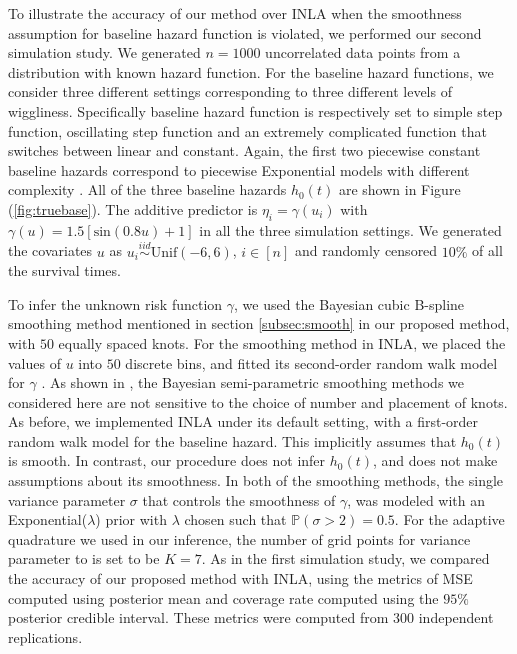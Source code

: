 \documentclass[ba]{imsart}
\begin{document}
To illustrate the accuracy of our method over INLA when the smoothness assumption for baseline hazard function is violated, we performed our second simulation study. We generated $n = 1000$ uncorrelated data points from a distribution with known hazard function. For the baseline hazard functions, we consider three different settings corresponding to three different levels of wiggliness. Specifically baseline hazard function is respectively set to simple step function, oscillating step function and an extremely complicated function that switches between linear and constant. Again, the first two piecewise constant baseline hazards correspond to piecewise Exponential models with different complexity \citep{piecewiseExp}. All of the three baseline hazards $h_{0}(t)$ are shown in Figure (\ref{fig:truebase}). The additive predictor is $\eta_{i} = \gamma\left(u_{i}\right)$ with $\gamma(u) = 1.5 [ \text{sin}(0.8u) + 1 ]$ in all the three simulation settings. We generated the covariates $u$ as  $u_{i}\overset{iid}{\sim}\text{Unif}(-6,6)$, $i \in [n]$ and randomly censored $10\%$ of all the survival times.

To infer the unknown risk function $\gamma$, we used the Bayesian cubic B-spline smoothing method mentioned in section \ref{subsec:smooth} in our proposed method, with $50$ equally spaced knots. For the smoothing method in INLA, we placed the values of $u$ into $50$ discrete bins, and fitted its second-order random walk model for $\gamma$ \citep{rw2}. As shown in \cite{casecross}, the Bayesian semi-parametric smoothing methods we considered here are not sensitive to the choice of number and placement of knots. 
As before, we implemented INLA under its default setting, with a first-order random walk model for the baseline hazard. This implicitly assumes that $h_{0}(t)$ is smooth. In contrast, our procedure does not infer $h_{0}(t)$, and does not make assumptions about its smoothness. In both of the smoothing methods, the single variance parameter $\sigma$ that controls the smoothness of $\gamma$, was modeled with an Exponential($\lambda$) prior with $\lambda$ chosen such that $\mathbb{P}\left( \sigma > 2\right) = 0.5$. For the adaptive quadrature we used in our inference, the number of grid points for variance parameter to is set to be $K = 7$. As in the first simulation study, we compared the accuracy of our proposed method with INLA, using the metrics of MSE computed using posterior mean and coverage rate computed using the $95\%$ posterior credible interval. These metrics were computed from 300 independent replications.
\end{document}
